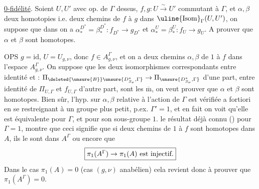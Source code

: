  \uline{0-fidélité}.  Soient \(U,U'\) avec op. de \(\Gamma\) dessus, \(f,g:U\stackrel{\sim}{\longrightarrow}U'\) commutant à \(\Gamma\), et \(\alpha,\beta\) deux homotopies  i.e. deux chemins de \(f\) à \(g\) dans \(\uline{\mathrm{Isom}}_\Gamma(U,U')\), on suppose que dans 
on a \(\alpha_*^{D^*}=\beta_*^{D^*}:f_{D^*}\to g_{D^*}\) et \(\alpha_*^U=\beta_*^U:f_U\to g_U\). A prouver que \(\alpha\) et \(\beta\) sont homotopes.


OPS \(g=\mathrm{id}\), \(U=U_{g,\nu}\), donc \(f\in A_{g,\nu}^{\Gamma}\), et on a deux chemins \(\alpha,\beta\) de \(1\) à  \(f\) dans l'espace \(A_{g,\nu}^{\Gamma}\). On suppose que les deux isomorphismes correspondants entre identité  et  : \(\Pi_{\deleted{\unsure{B}}\unsure{D^*_{S_\nu},\Gamma}}\to\Pi_{\unsure{D^*_{S_\nu},\Gamma}}\) d'une part, entre identité de \(\Pi_{U,\Gamma}\) et \(f_{U,\Gamma}\) d'autre part, sont les \(\overline{\mathrm m}\), on veut prouver que \(\alpha\) et \(\beta\) sont homotopes. Bien sûr, l'hyp.  sur \(\alpha,\beta\) relative à l'action de \(\Gamma\) est vérifiée a fortiori en se restreignant à un groupe plus petit, p.ex. \deleted{\unsure{\(\Gamma\)}} \(\Gamma'=1\), et en fait on voit qu'elle est équivalente pour \(\Gamma\), et pour son sous-groupe \(1\).  le résultat déjà connu () pour \(\Gamma=1\), montre que ceci signifie que si deux chemins  de \(1\) à \(f\) sont homotopes dans \(A\), ils le sont dans \(A^{\Gamma}\) ou encore que
\[
\fbox{\(\pi_1(A^{\Gamma})\to\pi_1(A)\ \mbox{est injectif.}\)}
\]
Dans le cas \(\pi_1(A)=0\) (cas \((g,\nu)\) anabélien) cela revient donc à prouver que \(\pi_1(A^{\Gamma})=0\).

